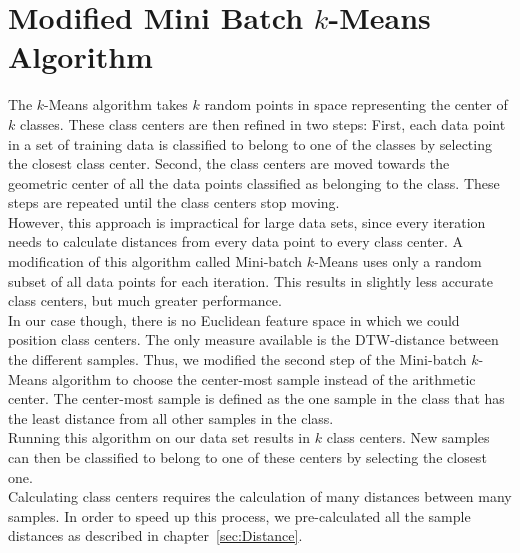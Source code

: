 \section{Modified Mini Batch $k$-Means Algorithm}
\label{sec:TheoryKMeans}
The $k$-Means algorithm takes $k$ random points in space representing the center of $k$ classes. These class centers are then refined in two steps: First, each data point in a set of training data is classified to belong to one of the classes by selecting the closest class center. Second, the class centers are moved towards the geometric center of all the data points classified as belonging to the class. These steps are repeated until the class centers stop moving.\\
However, this approach is impractical for large data sets, since every iteration needs to calculate distances from every data point to every class center. A modification of this algorithm called Mini-batch $k$-Means \cite{bib:Elkan2003} uses only a random subset of all data points for each iteration. This results in slightly less accurate class centers, but much greater performance.\\
In our case though, there is no Euclidean feature space in which we could position class centers. The only measure available is the DTW-distance between the different samples. Thus, we modified the second step of the Mini-batch $k$-Means algorithm to choose the center-most sample instead of the arithmetic center. The center-most sample is defined as the one sample in the class that has the least distance from all other samples in the class.\\
Running this algorithm on our data set results in $k$ class centers. New samples can then be classified to belong to one of these centers by selecting the closest one.\\
Calculating class centers requires the calculation of many distances between many samples. In order to speed up this process, we pre-calculated all the sample distances as described in chapter~\ref{sec:Distance}.
